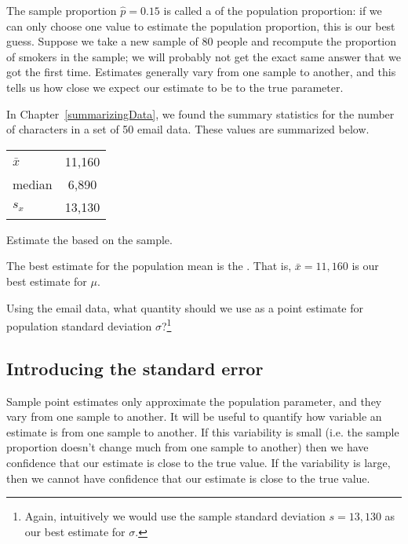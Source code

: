 The sample proportion $\hat{p} = 0.15$ is called a  of the population proportion: if we can only choose one value to estimate the population proportion, this is our best guess. Suppose we take a new sample of 80 people and recompute the proportion of smokers in the sample; we will probably not get the exact same answer that we got the first time.  Estimates generally vary from one sample to another, and this  tells us how close we expect our estimate to be to the true parameter.

\begin{example}{
In Chapter~\ref{summarizingData}, we found the summary statistics for the number of characters in a set of 50 email data.  These values are summarized below.  

\begin{tabular}{l c }
$\bar{x}$ & 11,160 \\
median & 6,890 \\
$s_x$ & 13,130
\end{tabular}

Estimate the  based on the sample.}The best estimate for the population mean is the . That is,
$\bar{x} = 11,160$ is our best estimate for $\mu$.
\end{example}

\begin{exercise}Using the email data, what quantity should we use as a point estimate for population standard deviation $\sigma$?\footnote{Again, intuitively we would use the sample standard deviation $s = 13,130$ as our best estimate for $\sigma$.}
\end{exercise}


\subsection{Introducing the standard error}

Sample point estimates only approximate the population parameter, and they vary from one sample to another. It will be useful to quantify how variable an estimate is from one sample to another. If this variability is small (i.e. the sample proportion doesn't change much from one sample to another) then we have confidence that our estimate is close to the true value. If the variability is large, then we cannot have confidence that our estimate is close to the true value.  


